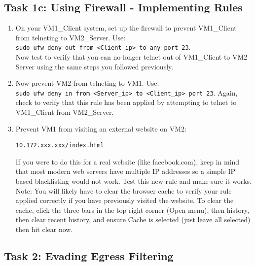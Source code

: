 \subsection{Task 1c: Using Firewall - Implementing Rules}
\begin{enumerate}
\item On your VM1\_Client system, set up the firewall to prevent VM1\_Client from telneting to VM2\_Server. Use:\\ {\tt  sudo ufw deny out from <Client\_ip> to any port 23}.\\  Now test to verify that you can no longer telnet out of VM1\_Client to VM2 Server using the same steps you followed previously. 
\item Now prevent VM2 from telneting to VM1. Use:\\ {\tt sudo ufw deny in from <Server\_ip> to <Client\_ip> port 23}. Again, check to verify that this rule has been applied by attempting to telnet to VM1\_Client from VM2\_Server.
\item Prevent VM1 from visiting an external website on  VM2:
\begin{verbatim}10.172.xxx.xxx/index.html \end{verbatim}
If you were to do this for a real website (like facebook.com), keep in mind that most modern web servers have multiple IP addresses so a simple IP based blacklisting would not work. Test this new rule and make sure it works. Note: You will likely have to clear the browser cache to verify your rule applied correctly if you have previously visited the website. To clear the cache, click the three bars in the top right corner (Open menu), then history, then clear recent history, and ensure Cache is selected (just leave all selected) then hit clear now.
\end{enumerate}



\subsection{Task 2: Evading Egress Filtering}

